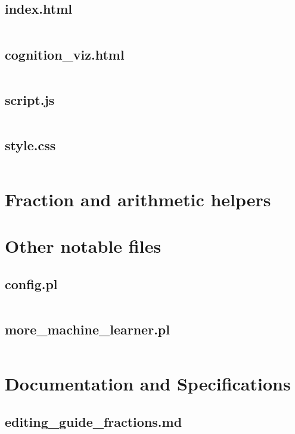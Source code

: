 \documentclass{article}
\begin{document}
\subsection{index.html}
\inputminted{html}{index.html}
\subsection{cognition\_viz.html}
\inputminted{html}{cognition_viz.html}
\subsection{script.js}
\inputminted{javascript}{script.js}
\subsection{style.css}
\inputminted{css}{style.css}

\section{Fraction and arithmetic helpers}

\section{Other notable files}
\subsection{config.pl}
\inputminted{prolog}{config.pl}
\subsection{more\_machine\_learner.pl}
\inputminted{prolog}{more_machine_learner.pl}

\section{Documentation and Specifications}
\subsection{editing\_guide\_fractions.md}
\inputminted{markdown}{editing_guide_fractions.md}
\end{document}
